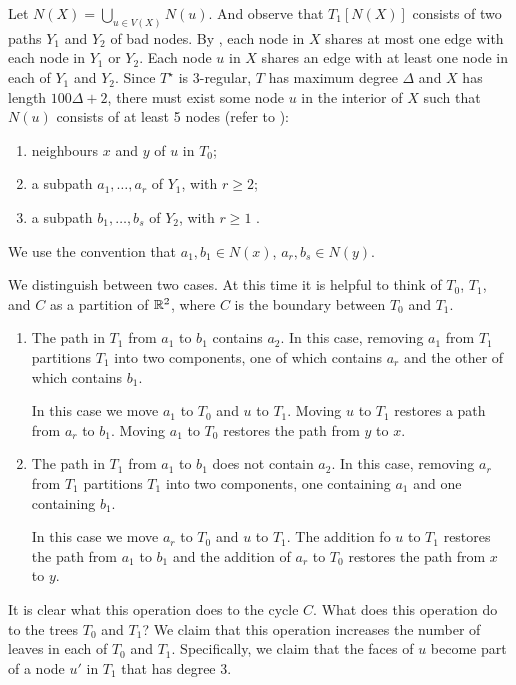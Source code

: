 \documentclass{patmorin}
\newcommand{\dual}[1]{{#1}^\star}
\begin{document}
Let $N(X)=\bigcup_{u\in V(X)} N(u)$.  And observe that $T_1[N(X)]$ consists of two paths $Y_1$ and $Y_2$ of bad nodes.  By , each node in $X$ shares at most one edge with each node in $Y_1$ or $Y_2$.  Each node $u$ in $X$ shares an edge with at least one node in each of $Y_1$ and $Y_2$.
Since $\dual{T}$ is 3-regular, $T$ has maximum degree $\Delta$ and $X$ has length $100\Delta+2$, there must exist some node $u$ in the interior of $X$ such that $N(u)$ consists of at least 5 nodes (refer to ):
\begin{enumerate}
   \item neighbours $x$ and $y$ of $u$ in $T_0$;
   \item a subpath $a_1,\ldots,a_r$ of $Y_1$, with $r\ge 2$;
   \item a subpath $b_1,\ldots,b_s$ of $Y_2$, with $r\ge 1$ \enspace .
\end{enumerate}
We use the convention that $a_1,b_1\in N(x)$, $a_r,b_s\in N(y)$.

We distinguish between two cases.  At this time it is helpful to think
of $T_0$, $T_1$, and $C$ as a partition of $\mathbb{R}^2$, where $C$ is the
boundary between $T_0$ and $T_1$.
\begin{enumerate}
   \item The path in $T_1$ from $a_1$ to $b_1$ contains $a_2$.
     In this case, removing $a_1$ from $T_1$ partitions $T_1$ into two
     components, one of which contains $a_r$ and the other of which
     contains $b_1$.

     In this case we move $a_1$ to $T_0$ and $u$ to $T_1$.  Moving $u$
     to $T_1$ restores a path from $a_r$ to $b_1$.  Moving $a_1$ to $T_0$
     restores the path from $y$ to $x$.

   \item The path in $T_1$ from $a_1$ to $b_1$ does not contain $a_2$.
     In this case, removing $a_r$ from $T_1$ partitions $T_1$ into two
     components, one containing $a_1$ and one containing $b_1$.

     In this case we move $a_r$ to $T_0$ and $u$ to $T_1$. The addition fo
     $u$ to $T_1$ restores the path from $a_1$ to $b_1$ and the addition
     of $a_r$ to $T_0$ restores the path from $x$ to $y$.
\end{enumerate}

It is clear what this operation does to the cycle $C$.  What does
this operation do to the trees $T_0$ and $T_1$?  We claim that this
operation increases the number of leaves in each of $T_0$ and $T_1$.
Specifically, we claim that the faces of $u$ become part of a node $u'$
in $T_1$ that has degree 3.
\end{document}
